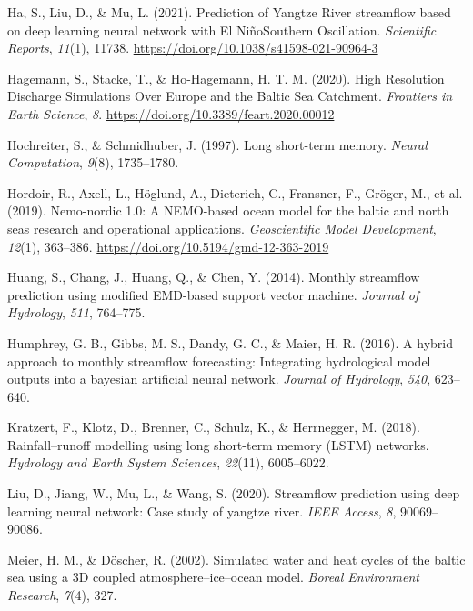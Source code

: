 \documentclass[
]{agujournal2019}
\newlength{\cslhangindent}
\newenvironment{CSLReferences}[2] %
 {\begin{list}{}{%
  \setlength{\itemindent}{0pt}
  \setlength{\leftmargin}{0pt}
  \setlength{\parsep}{0pt}
  \ifodd #1
   \setlength{\leftmargin}{\cslhangindent}
   \setlength{\itemindent}{-1\cslhangindent}
  \fi
  \setlength{\itemsep}{#2\baselineskip}}}
 {\end{list}}
\begin{document}
\begin{CSLReferences}{1}{0}
Ha, S., Liu, D., \& Mu, L. (2021). Prediction of Yangtze River
streamflow based on deep learning neural network with El
Niño{\textendash}Southern Oscillation. \emph{Scientific Reports},
\emph{11}(1), 11738. \url{https://doi.org/10.1038/s41598-021-90964-3}

Hagemann, S., Stacke, T., \& Ho-Hagemann, H. T. M. (2020). High
{Resolution Discharge Simulations Over Europe} and the {Baltic Sea
Catchment}. \emph{Frontiers in Earth Science}, \emph{8}.
\url{https://doi.org/10.3389/feart.2020.00012}

Hochreiter, S., \& Schmidhuber, J. (1997). Long short-term memory.
\emph{Neural Computation}, \emph{9}(8), 1735--1780.

Hordoir, R., Axell, L., Höglund, A., Dieterich, C., Fransner, F.,
Gröger, M., et al. (2019). Nemo-nordic 1.0: A NEMO-based ocean model for
the baltic and north seas {\textendash} research and operational
applications. \emph{Geoscientific Model Development}, \emph{12}(1),
363--386. \url{https://doi.org/10.5194/gmd-12-363-2019}

Huang, S., Chang, J., Huang, Q., \& Chen, Y. (2014). Monthly streamflow
prediction using modified EMD-based support vector machine.
\emph{Journal of Hydrology}, \emph{511}, 764--775.

Humphrey, G. B., Gibbs, M. S., Dandy, G. C., \& Maier, H. R. (2016). A
hybrid approach to monthly streamflow forecasting: Integrating
hydrological model outputs into a bayesian artificial neural network.
\emph{Journal of Hydrology}, \emph{540}, 623--640.

Kratzert, F., Klotz, D., Brenner, C., Schulz, K., \& Herrnegger, M.
(2018). Rainfall--runoff modelling using long short-term memory (LSTM)
networks. \emph{Hydrology and Earth System Sciences}, \emph{22}(11),
6005--6022.

Liu, D., Jiang, W., Mu, L., \& Wang, S. (2020). Streamflow prediction
using deep learning neural network: Case study of yangtze river.
\emph{IEEE Access}, \emph{8}, 90069--90086.

Meier, H. M., \& Döscher, R. (2002). Simulated water and heat cycles of
the baltic sea using a 3D coupled atmosphere--ice--ocean model.
\emph{Boreal Environment Research}, \emph{7}(4), 327.


\end{CSLReferences}
\end{document}
